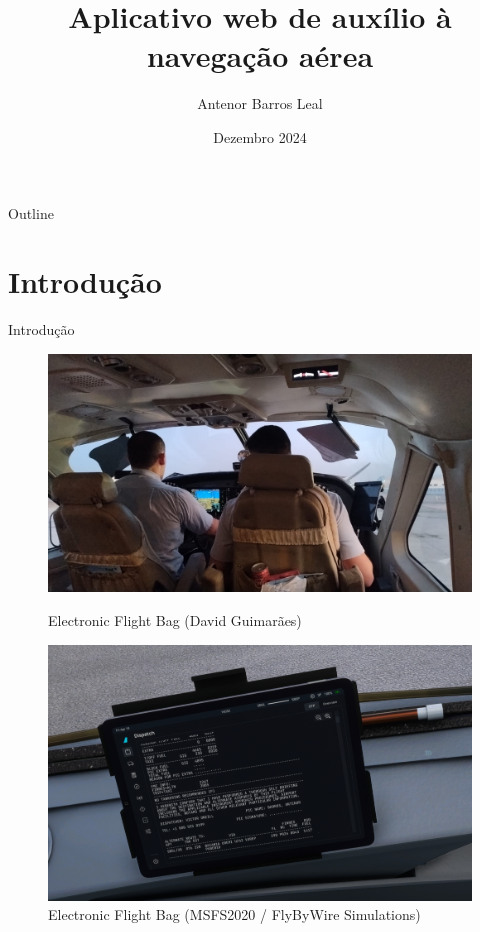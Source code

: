 \documentclass{beamer}
\title{Aplicativo web de auxílio à navegação aérea}
\author{Antenor Barros Leal}
\institute{Departamento de Informática \\ PUC-Rio}
\date{Dezembro 2024}
\begin{document}
\begin{frame}
    \titlepage
\end{frame}

\begin{frame}{Outline}
    \tableofcontents
\end{frame}

\section{Introdução}

\begin{frame}{Introdução}
    \begin{figure}[ht]
        \begin{minipage}[b]{0.45\linewidth}
            \centering
            \includegraphics[width=\textwidth]{img/efb-real-original.jpg}
            \caption{Electronic Flight Bag (David Guimarães)}
        \end{minipage}
        \hspace{0.5cm}
        \pause
        \begin{minipage}[b]{0.45\linewidth}
            \centering
            \includegraphics[width=\textwidth]{img/efb-a320.png}
            \caption{Electronic Flight Bag (MSFS2020 / FlyByWire Simulations)}
        \end{minipage}
    \end{figure}
\end{frame}
\end{document}
